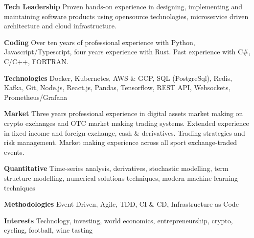 {\bf Tech Leadership} Proven hands-on experience in designing, implementing and maintaining software products
using opensource technologies, microservice driven architecture and cloud infrastructure.

{\bf Coding} Over ten years of professional experience with Python, Javascript/Typescript, four years experience with Rust.
Past experience with C\#, C/C++, FORTRAN.

{\bf Technologies} Docker, Kubernetes, AWS \& GCP, SQL (PostgreSql), Redis, Kafka, Git, Node.js, React.js, Pandas,
Tensorflow, REST API, Websockets, Prometheus/Grafana

{\bf Market} Three years professional experience in digital assets market making on crypto exchanges and OTC market making trading systems.
Extended experience in fixed income and foreign exchange, cash \& derivatives.
Trading strategies and risk management.
Market making experience across all sport exchange-traded events.

{\bf Quantitative} Time-series analysis, derivatives, stochastic modelling, term structure modelling, numerical solutions techniques, modern machine learning techniques

{\bf Methodologies} Event Driven, Agile, TDD, CI \& CD, Infrastructure as Code

{\bf Interests} Technology, investing, world economics, entrepreneurship, crypto, cycling, football, wine tasting
